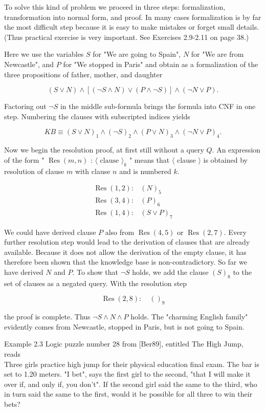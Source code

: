\documentclass[10pt]{book}
\begin{document}
To solve this kind of problem we proceed in three steps: formalization, transformation into normal form, and proof. In many cases formalization is by far the most difficult step because it is easy to make mistakes or forget small details. (Thus practical exercise is very important. See Exercises 2.9-2.11 on page 38.)

Here we use the variables $S$ for "We are going to Spain", $N$ for "We are from Newcastle", and $P$ for "We stopped in Paris" and obtain as a formalization of the three propositions of father, mother, and daughter

$$
(S \vee N) \wedge[(\neg S \wedge N) \vee(P \wedge \neg S)] \wedge(\neg N \vee P) .
$$

Factoring out $\neg S$ in the middle sub-formula brings the formula into CNF in one step. Numbering the clauses with subscripted indices yields

$$
K B \equiv(S \vee N)_{1} \wedge(\neg S)_{2} \wedge(P \vee N)_{3} \wedge(\neg N \vee P)_{4} .
$$

Now we begin the resolution proof, at first still without a query $Q$. An expression of the form " $\operatorname{Res}(m, n)$ : $\langle\text { clause }\rangle_{k}$ " means that $\langle$ clause $\rangle$ is obtained by resolution of clause $m$ with clause $n$ and is numbered $k$.

$$
\begin{array}{ll}
\operatorname{Res}(1,2): & (N)_{5} \\
\operatorname{Res}(3,4): & (P)_{6} \\
\operatorname{Res}(1,4): & (S \vee P)_{7}
\end{array}
$$

We could have derived clause $P$ also from $\operatorname{Res}(4,5)$ or $\operatorname{Res}(2,7)$. Every further resolution step would lead to the derivation of clauses that are already available. Because it does not allow the derivation of the empty clause, it has therefore been shown that the knowledge base is non-contradictory. So far we have derived $N$ and $P$. To show that $\neg S$ holds, we add the clause $(S)_{8}$ to the set of clauses as a negated query. With the resolution step

$$
\operatorname{Res}(2,8): \quad()_{9}
$$

the proof is complete. Thus $\neg S \wedge N \wedge P$ holds. The "charming English family" evidently comes from Newcastle, stopped in Paris, but is not going to Spain.

Example 2.3 Logic puzzle number 28 from [Ber89], entitled The High Jump, reads\\
Three girls practice high jump for their physical education final exam. The bar is set to 1.20 meters. "I bet", says the first girl to the second, "that I will make it over if, and only if, you don't". If the second girl said the same to the third, who in turn said the same to the first, would it be possible for all three to win their bets?
\end{document}
